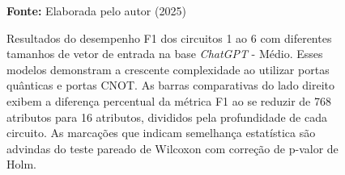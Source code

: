 \begin{figure}
\caption{Resultados do desempenho F1 dos circuitos 1 ao 6 com diferentes tamanhos de vetor de entrada na base \textit{ChatGPT} - Médio. Esses modelos demonstram a crescente complexidade ao utilizar portas quânticas e portas CNOT. As barras comparativas do lado direito exibem a diferença percentual da métrica F1 ao se reduzir de 768 atributos para 16 atributos, divididos pela profundidade de cada circuito. As marcações que indicam semelhança estatística são advindas do teste pareado de Wilcoxon com correção de p-valor de Holm.}
\label{fig:n_features:medium:g1}
     \centering
    \centering
      \par\medskip\ABNTEXfontereduzida\selectfont\textbf{Fonte:} Elaborada pelo autor (2025) \par\medskip
\end{figure}